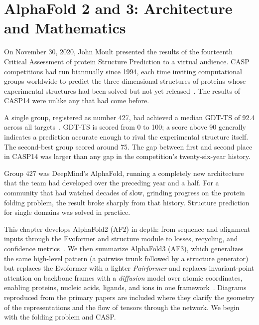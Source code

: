 \chapter{AlphaFold 2 and 3: Architecture and Mathematics}
\label{ch:alphafold}

On November 30, 2020, John Moult presented the results of the fourteenth Critical Assessment of protein Structure Prediction to a virtual audience.
CASP competitions had run biannually since 1994, each time inviting computational groups worldwide to predict the three-dimensional structures of proteins whose experimental structures had been solved but not yet released~\cite{moult1995}.
The results of CASP14 were unlike any that had come before.

A single group, registered as number 427, had achieved a median GDT-TS of 92.4 across all targets~\cite{jumper2021}.
GDT-TS is scored from 0 to 100; a score above 90 generally indicates a prediction accurate enough to rival the experimental structure itself.
The second-best group scored around 75.
The gap between first and second place in CASP14 was larger than any gap in the competition's twenty-six-year history.

Group 427 was DeepMind's AlphaFold, running a completely new architecture that the team had developed over the preceding year and a half.
For a community that had watched decades of slow, grinding progress on the protein folding problem, the result broke sharply from that history.
Structure prediction for single domains was solved in practice.

This chapter develops AlphaFold2 (AF2) in depth: from sequence and alignment inputs through the Evoformer and structure module to losses, recycling, and confidence metrics~\cite{jumper2021}.
We then summarize AlphaFold3 (AF3), which generalizes the same high-level pattern (a pairwise trunk followed by a structure generator) but replaces the Evoformer with a lighter \emph{Pairformer} and replaces invariant-point attention on backbone frames with a \emph{diffusion} model over atomic coordinates, enabling proteins, nucleic acids, ligands, and ions in one framework~\cite{abramson2024}.
Diagrams reproduced from the primary papers are included where they clarify the geometry of the representations and the flow of tensors through the network.
We begin with the folding problem and CASP.



